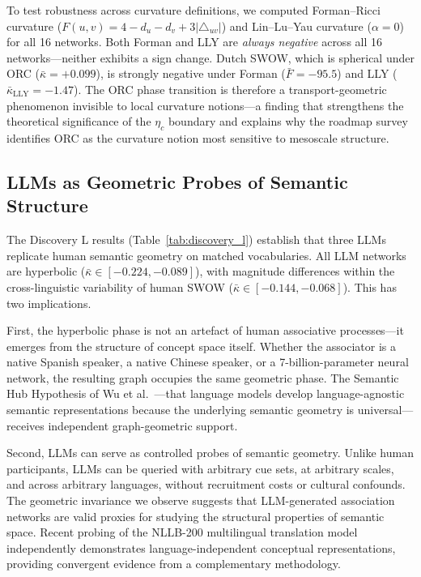 \documentclass[11pt,a4paper]{article}
\newcommand{\kbar}{\bar{\kappa}}
\begin{document}
To test robustness across curvature definitions, we computed Forman--Ricci curvature ($F(u,v) = 4 - d_u - d_v + 3|\triangle_{uv}|$) and Lin--Lu--Yau curvature ($\alpha=0$)~\cite{lin2011ricci} for all 16 networks. Both Forman and LLY are \emph{always negative} across all 16 networks---neither exhibits a sign change. Dutch SWOW, which is spherical under ORC ($\kbar = +0.099$), is strongly negative under Forman ($\bar{F} = -95.5$) and LLY ($\bar{\kappa}_{\mathrm{LLY}} = -1.47$). The ORC phase transition is therefore a transport-geometric phenomenon invisible to local curvature notions---a finding that strengthens the theoretical significance of the $\eta_c$ boundary and explains why the roadmap survey~\cite{samal2025roadmap} identifies ORC as the curvature notion most sensitive to mesoscale structure.

\subsection{LLMs as Geometric Probes of Semantic Structure}

The Discovery L results (Table~\ref{tab:discovery_l}) establish that three LLMs replicate human semantic geometry on matched vocabularies. All LLM networks are hyperbolic ($\kbar \in [-0.224, -0.089]$), with magnitude differences within the cross-linguistic variability of human SWOW ($\kbar \in [-0.144, -0.068]$). This has two implications.

First, the hyperbolic phase is not an artefact of human associative processes---it emerges from the structure of concept space itself. Whether the associator is a native Spanish speaker, a native Chinese speaker, or a 7-billion-parameter neural network, the resulting graph occupies the same geometric phase. The Semantic Hub Hypothesis of Wu et al.~\cite{wu2025semantic}---that language models develop language-agnostic semantic representations because the underlying semantic geometry is universal---receives independent graph-geometric support.

Second, LLMs can serve as controlled probes of semantic geometry. Unlike human participants, LLMs can be queried with arbitrary cue sets, at arbitrary scales, and across arbitrary languages, without recruitment costs or cultural confounds. The geometric invariance we observe suggests that LLM-generated association networks are valid proxies for studying the structural properties of semantic space. Recent probing of the NLLB-200 multilingual translation model~\cite{nllb2025universal} independently demonstrates language-independent conceptual representations, providing convergent evidence from a complementary methodology.
\end{document}
